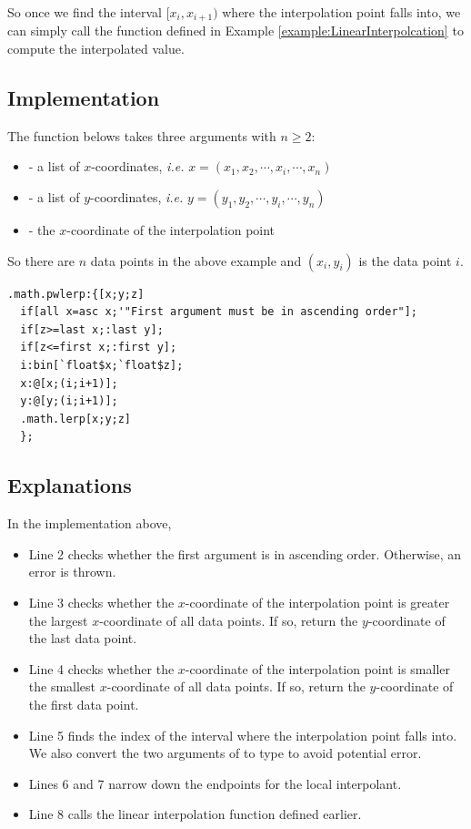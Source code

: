 So once we find the interval $[x_i, x_{i+1})$ where the interpolation point falls into, we can simply call the function defined in Example \ref{example:LinearInterpolcation} to compute the interpolated value.

\subsection{Implementation}
The function belows takes three arguments with $n \ge 2$:

\begin{itemize}
\item {} - a list of $x$-coordinates, \emph{i.e.} $x = (x_1, x_2, \cdots, x_i, \cdots, x_n)$
\item {} - a list of $y$-coordinates, \emph{i.e.} $y = (y_1, y_2, \cdots, y_i, \cdots, y_n)$
\item {} - the $x$-coordinate of the interpolation point
\end{itemize}

So there are $n$ data points in the above example and $(x_i,y_i)$ is the data point $i$.

\begin{verbatim}
.math.pwlerp:{[x;y;z]
  if[all x=asc x;'"First argument must be in ascending order"];
  if[z>=last x;:last y];
  if[z<=first x;:first y];
  i:bin[`float$x;`float$z];
  x:@[x;(i;i+1)];
  y:@[y;(i;i+1)];
  .math.lerp[x;y;z]
  };
\end{verbatim}


\subsection{Explanations}
In the implementation above,

\begin{itemize}
\item Line 2 checks whether the first argument is in ascending order. Otherwise, an error is thrown.
\item Line 3 checks whether the $x$-coordinate of the interpolation point is greater the largest $x$-coordinate of all data points. If so, return the $y$-coordinate of the last data point.
\item Line 4 checks whether the $x$-coordinate of the interpolation point is smaller the smallest $x$-coordinate of all data points. If so, return the $y$-coordinate of the first data point.
\item Line 5 finds the index of the interval where the interpolation point falls into. We also convert the two arguments of  to  type to avoid potential  error.
\item Lines 6 and 7 narrow down the endpoints for the local interpolant.
\item Line 8 calls the linear interpolation function defined earlier.
\end{itemize}



